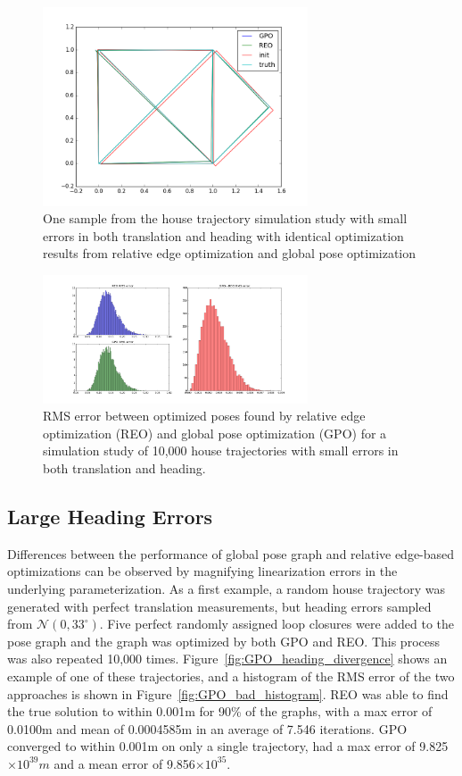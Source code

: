 \begin{figure}
  \includegraphics[width=0.7\textwidth]{figures/house_trajectory.png}
  \caption{One sample from the house trajectory simulation study with small errors in both translation and heading with identical optimization results from relative edge optimization and global pose optimization}
  \label{fig:house_trajectory}
\end{figure}

\begin{figure}[H]
  \includegraphics[width=0.7\textwidth]{figures/REO_vs_GPO_good.png}
  \caption{RMS error between optimized poses found by relative edge optimization (REO) and global pose optimization (GPO) for a simulation study of 10,000 house trajectories with small errors in both translation and heading.}
  \label{fig:convergence_house}
\end{figure}

\subsection{Large Heading Errors}
Differences between the performance of global pose graph and relative edge-based optimizations can be observed by magnifying linearization errors in the underlying parameterization. As a first example, a random house trajectory was generated with perfect translation measurements, but heading errors sampled from $\mathcal{N}(0, 33^\circ)$. Five perfect randomly assigned loop closures were added to the pose graph and the graph was optimized by both GPO and REO.  This process was also repeated 10,000 times.  Figure~\ref{fig:GPO_heading_divergence} shows an example of one of these trajectories, and a histogram of the RMS error of the two approaches is shown in Figure~\ref{fig:GPO_bad_histogram}. REO was able to find the true solution to within 0.001m for 90\% of the graphs, with a max error of 0.0100m and mean of 0.0004585m in an average of 7.546 iterations.  GPO converged to within 0.001m on only a single trajectory, had a max error of 9.825$\times 10 ^{39}m$ and a mean error of 9.856$\times 10 ^{35}$.

